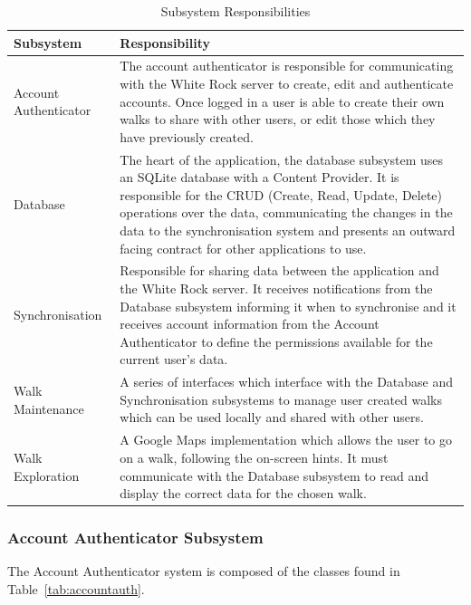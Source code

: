 \documentclass[11pt,a4paper]{report}
\begin{document}
\begin{longtable}{|p{5cm}|p{10cm}|}
\hline \caption{Subsystem Responsibilities - Continued on Next Page} \endfoot
\hline \caption{Subsystem Responsibilities} \label{tab:androidsystems} \endlastfoot
\hline
\textbf{Subsystem} & \textbf{Responsibility} \\ \hline
Account Authenticator & The account authenticator is responsible for communicating with the White Rock server to create, edit and authenticate accounts. Once logged in a user is able to create their own walks to share with other users, or edit those which they have previously created. \\ \hline
Database & The heart of the application, the database subsystem uses an SQLite database with a Content Provider. It is responsible for the CRUD (Create, Read, Update, Delete) operations over the data, communicating the changes in the data to the synchronisation system and presents an outward facing contract for other applications to use.  \\ \hline
Synchronisation & Responsible for sharing data between the application and the White Rock server. It receives notifications from the Database subsystem informing it when to synchronise and it receives account information from the Account Authenticator to define the permissions available for the current user's data. \\ \hline
Walk Maintenance & A series of interfaces which interface with the Database and Synchronisation subsystems to manage user created walks which can be used locally and shared with other users. \\ \hline
Walk Exploration & A Google Maps implementation which allows the user to go on a walk, following the on-screen hints. It must communicate with the Database subsystem to read and display the correct data for the chosen walk. \\ \hline
\end{longtable}

\subsubsection{Account Authenticator Subsystem}
\label{sec:accounts}

The Account Authenticator system is composed of the classes found in Table~\ref{tab:accountauth}. 
\end{document}
